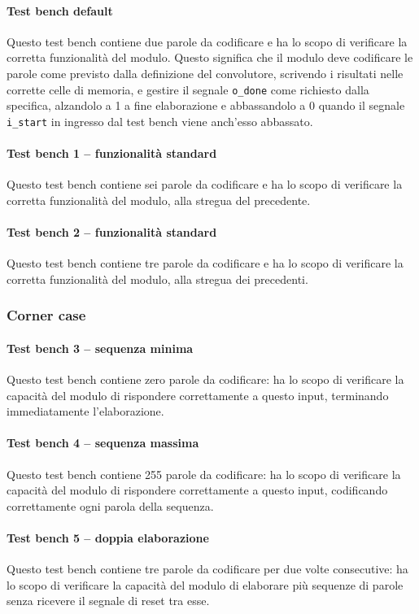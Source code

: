 \documentclass{article}
\begin{document}
				\paragraph{Test bench default}
					Questo test bench contiene due parole da codificare e ha lo scopo di verificare
					la corretta funzionalità del modulo. Questo significa che il modulo deve
					codificare le parole come previsto dalla definizione del convolutore, scrivendo
					i risultati nelle corrette celle di memoria, e gestire il segnale \verb|o_done|
					come richiesto dalla specifica, alzandolo a 1 a fine elaborazione e abbassandolo
					a 0 quando il segnale \verb|i_start| in ingresso dal test bench viene anch'esso
					abbassato.
				\paragraph{Test bench 1 -- funzionalità standard}
					Questo test bench contiene sei parole da codificare e ha lo scopo di verificare
					la corretta funzionalità del modulo, alla stregua del precedente.
				\paragraph{Test bench 2 -- funzionalità standard}
					Questo test bench contiene tre parole da codificare e ha lo scopo di verificare
					la corretta funzionalità del modulo, alla stregua dei precedenti.

			\subsubsection{Corner case}
				\paragraph{Test bench 3 -- sequenza minima}
					Questo test bench contiene zero parole da codificare: ha lo scopo di verificare
					la capacità del modulo di rispondere correttamente a questo input, terminando
					immediatamente l'elaborazione.
				\paragraph{Test bench 4 -- sequenza massima}
					Questo test bench contiene 255 parole da codificare: ha lo scopo di verificare
					la capacità del modulo di rispondere correttamente a questo input, codificando
					correttamente ogni parola della sequenza.
				\paragraph{Test bench 5 -- doppia elaborazione}
					Questo test bench contiene tre parole da codificare per due volte consecutive:
					ha lo scopo di verificare la capacità del modulo di elaborare più sequenze di
					parole senza ricevere il segnale di reset tra esse.
\end{document}

